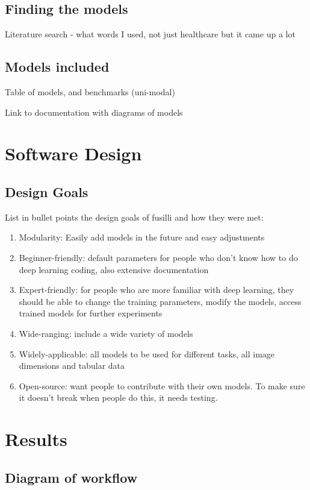 \subsection{Finding the models}
Literature search - what words I used, not just healthcare but it came up a lot 

\subsection{Models included}

Table of models, and benchmarks (uni-modal)

Link to documentation with diagrams of models

\section{Software Design}

\subsection{Design Goals}
List in bullet points the design goals of fusilli and how they were met: 
\begin{enumerate}
    \item Modularity: Easily add models in the future and easy adjustments
    \item Beginner-friendly: default parameters for people who don't know how to do deep learning coding, also extensive documentation
    \item Expert-friendly: for people who are more familiar with deep learning, they should be able to change the training parameters, modify the models, access trained models for further experiments
    \item Wide-ranging: include a wide variety of models
    \item Widely-applicable: all models to be used for different tasks, all image dimensions and tabular data
    \item Open-source: want people to contribute with their own models. To make sure it doesn't break when people do this, it needs testing. 
\end{enumerate}


\section{Results}

\subsection{Diagram of workflow}

